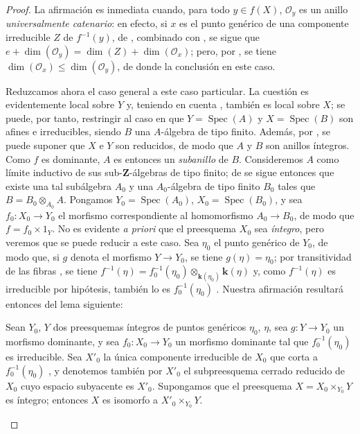 \begin{proof}
La afirmación es inmediata cuando, para todo $y\in f(X)$, $\mathcal O_y$ es un anillo \emph{universalmente catenario}: en efecto, si $x$ es el punto genérico de una componente irreducible $Z$ de $f^{-1}(y)$, de , combinado con , se sigue que $e+\dim(\mathcal O_y)=\dim(Z)+\dim(\mathcal O_x)$; pero, por , se tiene $\dim(\mathcal O_x)\leq\dim(\mathcal O_y)$, de donde la conclusión en este caso.

Reduzcamos ahora el caso general a este caso particular.
La cuestión es evidentemente local sobre $Y$ y, teniendo en cuenta , también es local sobre $X$; se puede, por tanto, restringir al caso en que $Y=\operatorname{Spec}(A)$ y $X=\operatorname{Spec}(B)$ son afines e irreducibles, siendo $B$ una $A$-álgebra de tipo finito.
Además, por , se puede suponer que $X$ e $Y$ son reducidos, de modo que $A$ y $B$ son anillos íntegros.
Como $f$ es dominante, $A$ es entonces un \emph{subanillo} de $B$.
Consideremos $A$ como límite inductivo de sus sub-$\mathbf Z$-álgebras de tipo finito; de  se sigue entonces que existe una tal subálgebra $A_0$ y una $A_0$-álgebra de tipo finito $B_0$ tales que $B=B_0\otimes_{A_0}A$.
Pongamos $Y_0=\operatorname{Spec}(A_0)$, $X_0=\operatorname{Spec}(B_0)$, y sea $f_0:X_0\to Y_0$ el morfismo correspondiente al homomorfismo $A_0\to B_0$, de modo que $f=f_0\times 1_Y$.
No es evidente \emph{a priori} que el preesquema $X_0$ sea \emph{íntegro}, pero veremos que se puede reducir a este caso.
Sea $\eta_0$ el punto genérico de $Y_0$, de modo que, si $g$ denota el morfismo $Y\to Y_0$, se tiene $g(\eta)=\eta_0$; por transitividad de las fibras , se tiene $f^{-1}(\eta)=f_0^{-1}(\eta_0)\otimes_{\mathbf{k}(\eta_0)}\boldsymbol{k}(\eta)$ y, como $f^{-1}(\eta)$ es irreducible por hipótesis, también lo es $f_0^{-1}(\eta_0)$ .
Nuestra afirmación resultará entonces del lema siguiente:

\begin{lemma}[13.1.2]
\label{IV.13.1.2}
Sean $Y_0$, $Y$ dos preesquemas íntegros de puntos genéricos $\eta_0$, $\eta$, sea $g:Y\to Y_0$ un morfismo dominante, y sea $f_0:X_0\to Y_0$ un morfismo dominante tal que $f_0^{-1}(\eta_0)$ es irreducible.
Sea $X'_0$ la única componente irreducible de $X_0$ que corta a $f_0^{-1}(\eta_0)$ \textup{}, y denotemos también por $X'_0$ el subpreesquema cerrado reducido de $X_0$ cuyo espacio subyacente es $X'_0$.
Supongamos que el preesquema $X=X_0\times_{Y_0}Y$ es íntegro; entonces $X$ es isomorfo a $X'_0\times_{Y_0}Y$.
\end{lemma}


\end{proof}
